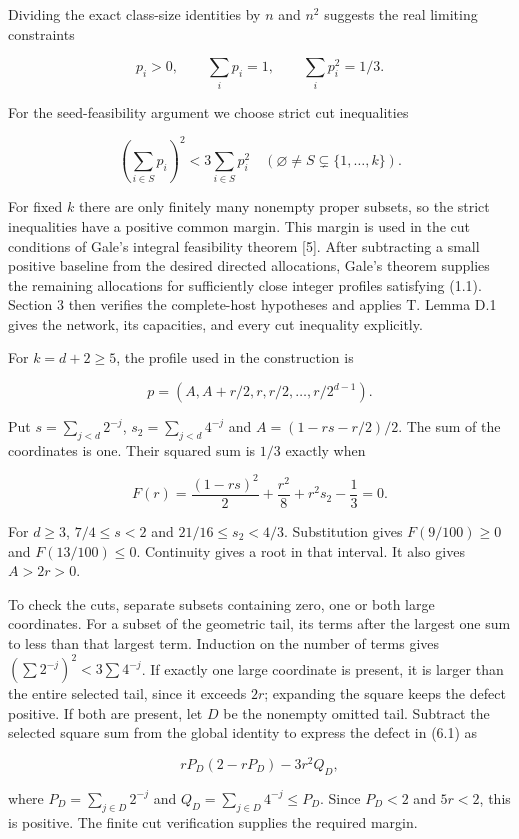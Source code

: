 \documentclass[english,11pt,a4paper]{article}
\newcounter{none}
\begin{document}
Dividing the exact class-size identities by \(n\) and \(n^2\) suggests the real limiting constraints

\[p_i>0,\qquad \sum_i p_i=1,\qquad \sum_i p_i^2=1/3.\]

For the seed-feasibility argument we choose strict cut inequalities

\[\left(\sum_{i\in S}p_i\right)^2<3\sum_{i\in S}p_i^2
\quad(\varnothing\ne S\subsetneq\{1,\ldots,k\}).\tag{6.1}\]

For fixed \(k\) there are only finitely many nonempty proper subsets, so the strict inequalities have a positive common margin. This margin is used in the cut conditions of Gale's integral feasibility theorem {[}5{]}. After subtracting a small positive baseline from the desired directed allocations, Gale's theorem supplies the remaining allocations for sufficiently close integer profiles satisfying (1.1). Section 3 then verifies the complete-host hypotheses and applies T. Lemma D.1 gives the network, its capacities, and every cut inequality explicitly.

For \(k=d+2\ge5\), the profile used in the construction is

\[p=(A,A+r/2,r,r/2,\ldots,r/2^{d-1}).\]

Put \(s=\sum_{j<d}2^{-j}\), \(s_2=\sum_{j<d}4^{-j}\) and \(A=(1-rs-r/2)/2\). The sum of the coordinates is one. Their squared sum is \(1/3\) exactly when

\[F(r)=\frac{(1-rs)^2}{2}+\frac{r^2}{8}+r^2s_2-\frac13=0.\]

For \(d\ge3\), \(7/4\le s<2\) and \(21/16\le s_2<4/3\). Substitution gives \(F(9/100)\ge0\) and \(F(13/100)\le0\). Continuity gives a root in that interval. It also gives \(A>2r>0\).

To check the cuts, separate subsets containing zero, one or both large coordinates. For a subset of the geometric tail, its terms after the largest one sum to less than that largest term. Induction on the number of terms gives \((\sum 2^{-j})^2<3\sum4^{-j}\). If exactly one large coordinate is present, it is larger than the entire selected tail, since it exceeds \(2r\); expanding the square keeps the defect positive. If both are present, let \(D\) be the nonempty omitted tail. Subtract the selected square sum from the global identity to express the defect in (6.1) as

\[rP_D(2-rP_D)-3r^2Q_D,\]

where \(P_D=\sum_{j\in D}2^{-j}\) and \(Q_D=\sum_{j\in D}4^{-j}\le P_D\). Since \(P_D<2\) and \(5r<2\), this is positive. The finite cut verification supplies the required margin.
\end{document}
